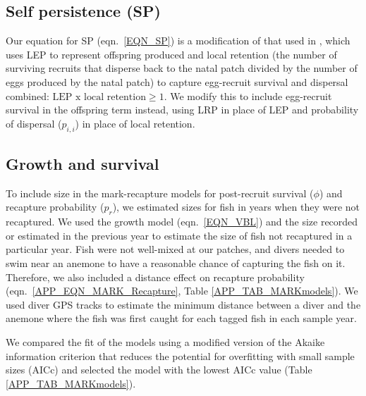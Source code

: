 \documentclass[12pt, oneside]{article}   	%
\begin{document}
\subsection{Self persistence (SP)} \label{APP_SEC_METHODS_SP}

Our equation for SP (eqn.\ \ref{EQN_SP}) is a modification of that used in \cite{burgess2014beyond}, which uses LEP to represent offspring produced and local retention (the number of surviving recruits that disperse back to the natal patch divided by the number of eggs produced by the natal patch) to capture egg-recruit survival and dispersal combined: $\text{LEP } \text{x } \text{local retention} \geq 1$. We modify this to include egg-recruit survival in the offspring term instead, using LRP in place of LEP and probability of dispersal ($p_{i,i}$) in place of local retention.
 

\subsection{Growth and survival} \label{APP_SEC_METHODS_Growth_and_survival}

To include size in the mark-recapture models for post-recruit survival ($\phi$) and recapture probability ($p_r$), we estimated sizes for fish in years when they were not recaptured. We used the growth model (eqn.\ \ref{EQN_VBL}) and the size recorded or estimated in the previous year to estimate the size of fish not recaptured in a particular year. Fish were not well-mixed at our patches, and divers needed to swim near an anemone to have a reasonable chance of capturing the fish on it. Therefore, we also included a distance effect on recapture probability (eqn.\ \ref{APP_EQN_MARK_Recapture}, Table \ref{APP_TAB_MARKmodels}). We used diver GPS tracks to estimate the minimum distance between a diver and the anemone where the fish was first caught for each tagged fish in each sample year.

We compared the fit of the models using a modified version of the Akaike information criterion that reduces the potential for overfitting with small sample sizes (AICc) and selected the model with the lowest AICc value (Table \ref{APP_TAB_MARKmodels}).

\end{document}
